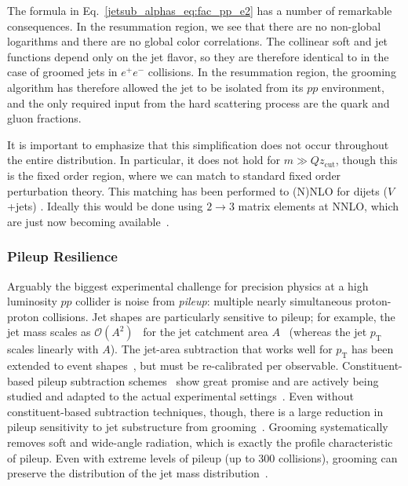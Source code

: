 \documentclass[11pt]{cernrep}
\begin{document}
The formula in Eq.~\eqref{jetsub_alphas_eq:fac_pp_e2} has a number of remarkable consequences.
%
In the resummation region, we see that there are no non-global logarithms and there are no global color correlations.
%
The collinear soft and jet functions depend only on the jet flavor, so they are therefore identical to in the case of groomed jets in $e^+e^-$ collisions.
%
In the resummation region, the grooming algorithm has therefore allowed the jet to be isolated from its $pp$ environment, and the only required input from the hard scattering process are the quark and gluon fractions. 

It is important to emphasize that this simplification does not occur throughout the entire distribution.
%
In particular, it does not hold for $m \gg Qz_{\mathrm{cut}} $, though this is the fixed order region, where we can match to standard fixed order perturbation theory.
%
This matching has been performed to (N)NLO for dijets ($V$+jets) \cite{Frye:2016aiz,Marzani:2017kqd,Marzani:2017mva}.
%
Ideally this would be done using $2\to 3$ matrix elements at NNLO, which are just now becoming available~\cite{Gehrmann:2015bfy,Dunbar:2016aux,Badger:2013yda,Badger:2017jhb,Abreu:2017hqn}.

\subsubsection{Pileup Resilience}

Arguably the biggest experimental challenge for precision physics at a high luminosity $pp$ collider is noise from \textit{pileup}: multiple nearly simultaneous proton-proton collisions.
%
Jet shapes are particularly sensitive to pileup; for example, the jet mass scales as $\mathcal{O}(A^2)$~\cite{Salam:2009jx} for the jet catchment area $A$~\cite{Cacciari:2008gn} (whereas the jet $p_\mathrm{T}$ scales linearly with $A$).
%
The jet-area subtraction that works well for $p_\mathrm{T}$ has been extended to event shapes~\cite{Soyez:2012hv}, but must be re-calibrated per observable.
%
Constituent-based pileup subtraction schemes~\cite{Cacciari:2014gra,Krohn:2013lba,Bertolini:2014bba,Berta:2014eza,Komiske:2017ubm} show great promise and are actively being studied and adapted to the actual experimental settings~\cite{CMS-PAS-JME-14-001,CMS-DP-2015-034,ATLAS-CONF-2017-065,ATL-PHYS-PUB-2017-020,Aad:2015ina}.
%
Even without constituent-based subtraction techniques, though, there is a large reduction in pileup sensitivity to jet substructure from grooming~\cite{CMS-PAS-JME-14-001,Aad:2015rpa,Aad:2015ina,Altheimer:2013yza}.
%
Grooming systematically removes soft and wide-angle radiation, which is exactly the profile characteristic of pileup.
%
Even with extreme levels of pileup (up to 300 collisions), grooming can preserve the distribution of the jet mass distribution~\cite{JetSubstructureECFA2014}. 
\end{document}
